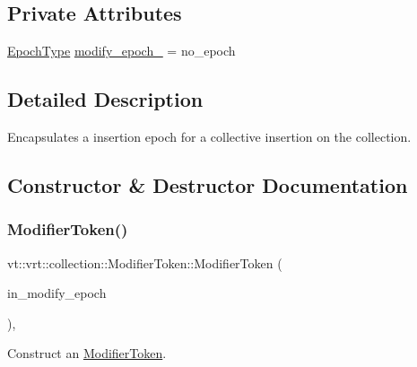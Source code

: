 \subsection*{Private Attributes}
\begin{DoxyCompactItemize}
\item 
\hyperlink{namespacevt_a985a5adf291c34a3ca263b3378388236}{Epoch\+Type} \hyperlink{structvt_1_1vrt_1_1collection_1_1_modifier_token_a3c0115cdf4a5097aa9ff940b0e8c9172}{modify\+\_\+epoch\+\_\+} = no\+\_\+epoch
\end{DoxyCompactItemize}


\subsection{Detailed Description}
Encapsulates a insertion epoch for a collective insertion on the collection. 

\subsection{Constructor \& Destructor Documentation}
\mbox{\label{structvt_1_1vrt_1_1collection_1_1_modifier_token_a6c0d5fed4a1575396c0e2f6656cffd75}} 
\subsubsection{\texorpdfstring{Modifier\+Token()}{ModifierToken()}\hspace{0.1cm}{\footnotesize\ttfamily [1/3]}}
{\footnotesize\ttfamily vt\+::vrt\+::collection\+::\+Modifier\+Token\+::\+Modifier\+Token (\begin{DoxyParamCaption}\item[{\hyperlink{namespacevt_a985a5adf291c34a3ca263b3378388236}{Epoch\+Type}}]{in\+\_\+modify\+\_\+epoch }\end{DoxyParamCaption})\hspace{0.3cm}{\ttfamily [inline]}, {\ttfamily [explicit]}}



Construct an {\ttfamily \hyperlink{structvt_1_1vrt_1_1collection_1_1_modifier_token}{Modifier\+Token}}. 



